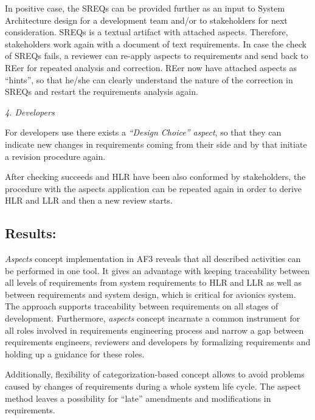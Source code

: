 
In positive  case, the SREQs can be provided further as an input to System Architecture design for a development team and/or to stakeholders for next consideration. SREQs is a textual artifact with attached aspects. Therefore, stakeholders work again with a document of text requirements.
In case the check of SREQs fails, a reviewer can re-apply aspects to requirements and send back to REer for repeated analysis and correction. REer now have attached aspects as “hints”, so that he/she can clearly understand the nature of the correction in SREQs and restart the requirements analysis again.

\textit{4. Developers}

For developers use there exists a \textit{“Design Choice” aspect}, so that they can indicate new changes in requirements coming from their side and by that initiate a revision procedure again.

After checking succeeds and HLR have been also conformed by stakeholders, the procedure with the aspects application can be repeated again in order to derive HLR and LLR and then a new review starts.

\subsection{Results:}
\textit{Aspects} concept implementation in AF3 reveals that all described activities can be performed in one tool. It gives an advantage with keeping traceability between all levels of requirements from system requirements to HLR and LLR as well as between requirements and system design, which is critical for avionics system. The approach supports traceability between requirements on all stages of development. Furthermore, \textit{aspects} concept incarnate a common instrument for all roles involved in requirements engineering process and narrow a gap between requirements engineers, reviewers and developers by formalizing requirements and holding up a guidance for these roles.

Additionally, flexibility of categorization-based concept allows to avoid problems caused by changes of requirements during a whole system life cycle. The aspect method leaves a possibility for ``late'' amendments and modifications in requirements.

